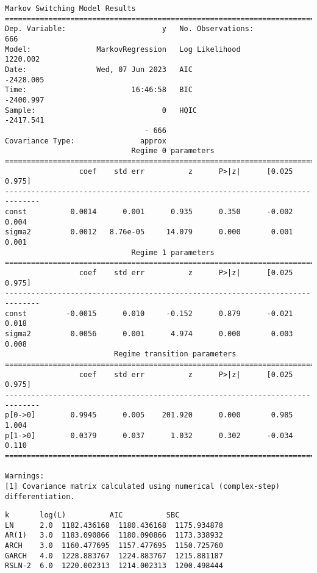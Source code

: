 \documentclass[11pt]{article}
\makeatletter
\newcommand{\boxspacing}{\kern\kvtcb@left@rule\kern\kvtcb@boxsep}
\newcommand{\prompt}[4]{
        {\ttfamily\llap{{\color{#2}[#3]:\hspace{3pt}#4}}\vspace{-\baselineskip}}
    }
\makeatother
\begin{document}
    \begin{Verbatim}[commandchars=\\\{\}]
                        Markov Switching Model Results
==============================================================================
Dep. Variable:                      y   No. Observations:                  666
Model:               MarkovRegression   Log Likelihood                1220.002
Date:                Wed, 07 Jun 2023   AIC                          -2428.005
Time:                        16:46:58   BIC                          -2400.997
Sample:                             0   HQIC                         -2417.541
                                - 666
Covariance Type:               approx
                             Regime 0 parameters
==============================================================================
                 coef    std err          z      P>|z|      [0.025      0.975]
------------------------------------------------------------------------------
const          0.0014      0.001      0.935      0.350      -0.002       0.004
sigma2         0.0012   8.76e-05     14.079      0.000       0.001       0.001
                             Regime 1 parameters
==============================================================================
                 coef    std err          z      P>|z|      [0.025      0.975]
------------------------------------------------------------------------------
const         -0.0015      0.010     -0.152      0.879      -0.021       0.018
sigma2         0.0056      0.001      4.974      0.000       0.003       0.008
                         Regime transition parameters
==============================================================================
                 coef    std err          z      P>|z|      [0.025      0.975]
------------------------------------------------------------------------------
p[0->0]        0.9945      0.005    201.920      0.000       0.985       1.004
p[1->0]        0.0379      0.037      1.032      0.302      -0.034       0.110
==============================================================================

Warnings:
[1] Covariance matrix calculated using numerical (complex-step) differentiation.
    \end{Verbatim}

            \begin{tcolorbox}[breakable, size=fbox, boxrule=.5pt, pad at break*=1mm, opacityfill=0]
\prompt{Out}{outcolor}{53}{\boxspacing}
\begin{Verbatim}[commandchars=\\\{\}]
          k       log(L)          AIC          SBC
LN      2.0  1182.436168  1180.436168  1175.934878
AR(1)   3.0  1183.090866  1180.090866  1173.338932
ARCH    3.0  1160.477695  1157.477695  1150.725760
GARCH   4.0  1228.883767  1224.883767  1215.881187
RSLN-2  6.0  1220.002313  1214.002313  1200.498444
\end{Verbatim}
\end{tcolorbox}
\end{document}
